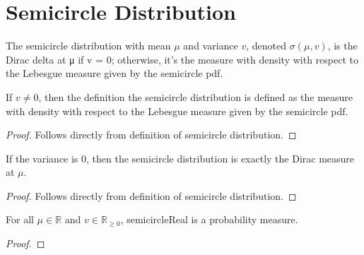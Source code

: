 

\section{Semicircle Distribution}




\begin{definition}
  \label{def:semicircleReal}
  \leanok
  The semicircle distribution with mean $\mu$ and variance $v$, denoted $\sigma(\mu, v)$, is the Dirac delta at μ if v = 0; otherwise, it's the measure with density with respect to the Lebesgue measure given by the semicircle pdf.
\end{definition}

\begin{lemma}
  \label{lem:semicircleReal_of_var_ne_zero}
  \leanok
  If $v \neq 0$, then the definition the semicircle distribution is defined as the measure with density with respect to the Lebesgue measure given by the semicircle pdf.
\end{lemma}

\begin{proof}
  \leanok
  Follows directly from definition of semicircle distribution.
\end{proof}

\begin{lemma}
  \label{lem:semicircleReal_zero_var}
  \leanok
  If the variance is 0, then the semicircle distribution is exactly the Dirac measure at $\mu$.
\end{lemma}

\begin{proof}
  \leanok
  Follows directly from definition of semicircle distribution.
\end{proof}

\begin{lemma} %
  \label{lem:instIsProbabilityMeasuresemicircleReal}
  \leanok

  For all $\mu \in \mathbb{R}$ and $v \in \mathbb{R}_{\ge 0}$, semicircleReal is a probability measure.
\end{lemma}

\begin{proof}
\leanok
\end{proof}

